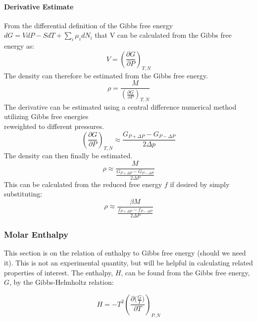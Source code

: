 \documentclass[aps,pre,nofootinbib,superscriptaddress,linenumbers,10pt, draft,tightenlines]{revtex4-1}
\begin{document}
\begin{itemize}
\begin{itemize}
    	\paragraph{Derivative Estimate}
    	From the differential definition of the Gibbs free energy $dG = VdP -SdT + \sum_i \mu_i dN_i$ that V can be calculated from the Gibbs free energy as:
    	\begin{equation} V = \left( \frac{\partial G}{\partial P} \right)_{T,N} \end{equation}
    	The density can therefore be estimated from the Gibbs free energy.
    	\begin{equation} \rho = \frac{M}{ \left( \frac{\partial G}{\partial P} \right)_{T,N}} \end{equation}
    	The derivative can be estimated using a central difference numerical method utilizing Gibbs 
    	free energies \\ reweighted to different pressures.
    	\begin{equation} \left( \frac{\partial G}{\partial P} \right)_{T,N} \approx \frac{G_{P + \Delta P} - G_{P-\Delta P}}{2\Delta p} \end{equation}
    	The density can then finally be estimated.
    	\begin{equation} \rho \approx \frac{M}{\frac{G_{P + \Delta P} - G_{P-\Delta P}}{2\Delta P}} \end{equation}
    	This can be calculated from the reduced free energy $f$ if desired by simply substituting:
    	\begin{equation} \rho \approx \frac{\beta M}{\frac{f_{P + \Delta P} - f_{P-\Delta P}}{2\Delta P}} \end{equation}
    	
    	\subsubsection{Molar Enthalpy}
    	This section is on the relation of enthalpy to Gibbs free energy (should we need it). This is not an experimental quantity, but will be helpful in calculating related properties of interest. The enthalpy, $H$, can be found from the Gibbs free energy, $G$, by the Gibbs-Helmholtz relation: 
    	
    	\begin{equation}H=-T^2 \left(\frac{\partial \big(\frac{G}{T}\big)}{\partial T}\right)_{P,N}\end{equation}
    	

\end{itemize}
\end{itemize}
\end{document}
